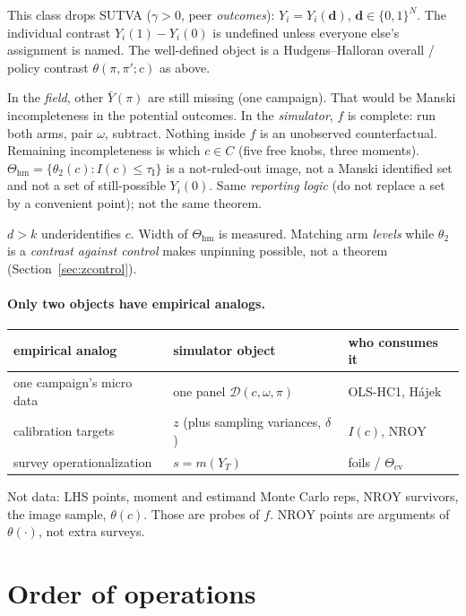 \documentclass[11pt]{article}
\newcommand{\NROY}{\mathrm{NROY}}
\newcommand{\hm}{\mathrm{hm}}
\newcommand{\cv}{\mathrm{cv}}
\newcommand{\thr}{\tau_{\mathrm{I}}}
\begin{document}
This class drops SUTVA ($\gamma>0$, peer \emph{outcomes}):
$Y_i=Y_i(\mathbf{d})$, $\mathbf{d}\in\{0,1\}^N$. The individual
contrast $Y_i(1)-Y_i(0)$ is undefined unless everyone else's assignment
is named. The well-defined object is a Hudgens--Halloran overall /
policy contrast $\theta(\pi,\pi';c)$ as above.

In the \emph{field}, other $\bar Y(\pi)$ are still missing (one
campaign). That would be Manski incompleteness in the potential
outcomes. In the \emph{simulator}, $f$ is complete: run both arms, pair
$\omega$, subtract. Nothing inside $f$ is an unobserved counterfactual.
Remaining incompleteness is which $c\in C$ (five free knobs, three
moments). $\Theta_{\hm}=\{\theta_2(c):I(c)\le\thr\}$ is a
not-ruled-out image, not a Manski identified set and not a set of
still-possible $Y_i(0)$. Same \emph{reporting logic} (do not replace a
set by a convenient point); not the same theorem.

$d>k$ underidentifies $c$. Width of $\Theta_{\hm}$ is measured. Matching
arm \emph{levels} while $\theta_2$ is a \emph{contrast against control}
makes unpinning possible, not a theorem (Section~\ref{sec:zcontrol}).

\paragraph{Only two objects have empirical analogs.}
\begin{center}
\small
\begin{tabular}{@{}llp{55mm}@{}}
\toprule
empirical analog & simulator object & who consumes it \\
\midrule
one campaign's micro data
  & one panel $\mathcal{D}(c,\omega,\pi)$
  & OLS-HC1, H\'ajek \\
calibration targets
  & $z$ (plus sampling variances, $\delta$)
  & $I(c)$, $\NROY$ \\
survey operationalization
  & $s=m(Y_T)$
  & foils / $\Theta_{\cv}$ \\
\bottomrule
\end{tabular}
\end{center}
Not data: LHS points, moment and estimand Monte Carlo reps, $\NROY$
survivors, the image sample, $\theta(c)$. Those are probes of $f$.
$\NROY$ points are arguments of $\theta(\cdot)$, not extra surveys.

\section{Order of operations}
\end{document}
